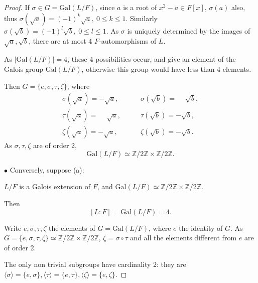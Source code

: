 \documentclass[11pt,a4paper]{article}
\newcommand{\Z}{\mathbb{Z}}
\newcommand{\Gal}{\mathrm{Gal}}
\begin{document}
\begin{proof}
If $\sigma \in G = \Gal(L/F)$, since $a$ is a root of $x^2 -a \in F[x]$, $\sigma(a)$ also, thus $\sigma(\sqrt{a}) =(-1)^k \sqrt{a},\  0 \leq k \leq 1$. Similarly $\sigma(\sqrt{b}) =(-1)^l \sqrt{b}, \ 0 \leq l \leq 1$. As $\sigma$ is uniquely determined by the images of $\sqrt{a}, \sqrt{b}$, there are at most 4 $F$-automorphisms of $L$.

As $\vert \Gal(L/F) \vert = 4$,  these 4 possibilities occur, and give an element of the Galois group $\Gal(L/F)$, otherwise this group would have less than 4 elements. 

Then
$G = \{e, \sigma, \tau, \zeta\}$, where 
\begin{align*}
\sigma(\sqrt{a}) = -\sqrt{a}, \qquad&\sigma(\sqrt{b}) = \phantom{-}\sqrt{b},\\
\tau(\sqrt{a}) = \phantom{-}\sqrt{a}, \qquad&\tau(\sqrt{b}) = -\sqrt{b},\\
\zeta(\sqrt{a}) = -\sqrt{a}, \qquad&\zeta(\sqrt{b}) = -\sqrt{b}.
\end{align*}
As $\sigma, \tau, \zeta$ are of order 2, 
$$\Gal(L/F) \simeq \Z/2\Z \times \Z/2\Z.$$

$\bullet$ Conversely, suppose (a): 
\begin{center}
$L/F$ is a Galois extension of $F$,  and $\Gal(L/F) \simeq \Z/2\Z \times \Z/2\Z$.
\end{center}
Then $$[L:F] = \Gal(L/F) = 4.$$

Write $e,\sigma, \tau,\zeta$ the elements of $G =\Gal(L/F) $, where $e$ the identity of $G$. As $G  = \{e,\sigma,\tau, \zeta\} \simeq \Z/2\Z \times \Z/2\Z$, $\zeta = \sigma \circ \tau$ and all the elements different from $e$ are of order 2.

The only non trivial subgroups have cardinality 2: they are $\langle \sigma \rangle = \{e,\sigma\}, \langle \tau \rangle = \{e,\tau\},\langle \zeta \rangle = \{e,\zeta\}$.

\bigskip



\end{proof}
\end{document}
